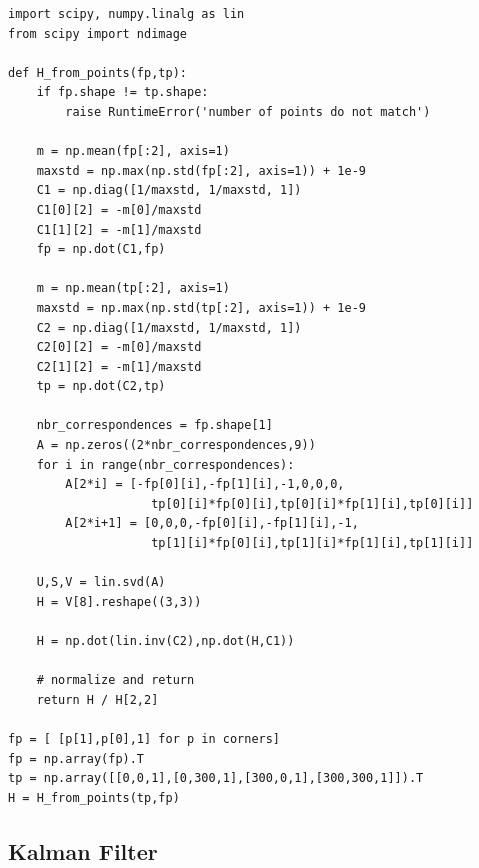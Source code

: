 \documentclass{article}
\begin{document}
\begin{verbatim}
import scipy, numpy.linalg as lin
from scipy import ndimage

def H_from_points(fp,tp):
    if fp.shape != tp.shape:
        raise RuntimeError('number of points do not match')
        
    m = np.mean(fp[:2], axis=1)
    maxstd = np.max(np.std(fp[:2], axis=1)) + 1e-9
    C1 = np.diag([1/maxstd, 1/maxstd, 1]) 
    C1[0][2] = -m[0]/maxstd
    C1[1][2] = -m[1]/maxstd
    fp = np.dot(C1,fp)
    
    m = np.mean(tp[:2], axis=1)
    maxstd = np.max(np.std(tp[:2], axis=1)) + 1e-9
    C2 = np.diag([1/maxstd, 1/maxstd, 1])
    C2[0][2] = -m[0]/maxstd
    C2[1][2] = -m[1]/maxstd
    tp = np.dot(C2,tp)
    
    nbr_correspondences = fp.shape[1]
    A = np.zeros((2*nbr_correspondences,9))
    for i in range(nbr_correspondences):        
        A[2*i] = [-fp[0][i],-fp[1][i],-1,0,0,0,
                    tp[0][i]*fp[0][i],tp[0][i]*fp[1][i],tp[0][i]]
        A[2*i+1] = [0,0,0,-fp[0][i],-fp[1][i],-1,
                    tp[1][i]*fp[0][i],tp[1][i]*fp[1][i],tp[1][i]]
    
    U,S,V = lin.svd(A)
    H = V[8].reshape((3,3))    
    
    H = np.dot(lin.inv(C2),np.dot(H,C1))
    
    # normalize and return
    return H / H[2,2]

fp = [ [p[1],p[0],1] for p in corners]
fp = np.array(fp).T
tp = np.array([[0,0,1],[0,300,1],[300,0,1],[300,300,1]]).T
H = H_from_points(tp,fp)
\end{verbatim}

\subsection{Kalman Filter}
\end{document}
